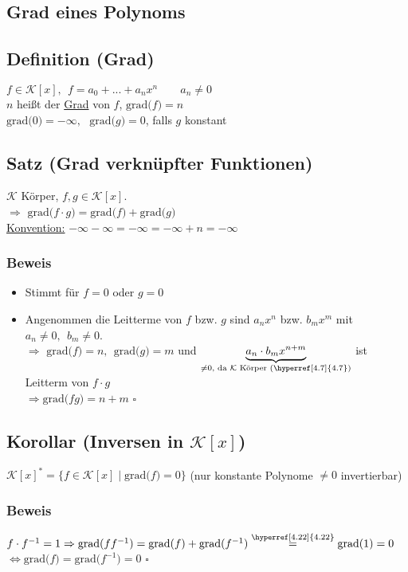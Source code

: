 \documentclass[a4paper, 12pt,titlepage, pdf, headsepline]{scrartcl}
\newcommand{\grad}[1]{\textrm{grad(}#1\textrm{)}}
\newcommand{\K}{\mathcal{K}}
\newcommand{\uline}[1]{\underline{#1}}
\newcommand{\qed}{\hfill$\square$}
\renewcommand{\>}{\rightarrow}
\renewcommand{\*}{\cdot}
\begin{document}
		      	\subsection*{Grad eines Polynoms}
		      	\subsection{Definition (Grad)}
		      	$f \in \K[x], ~~f = a_0 + ... + a_nx^n  \qquad a_n \neq 0$\\
		      	$n$ heißt der \uline{Grad} von $f$, $\grad{f}= n$\\
		      	$\grad{0}= -\infty,~~~\grad{g}= 0$, falls $g$ konstant
		      	\subsection{Satz (Grad verknüpfter Funktionen)}
		      	\label{4.22}
		      	$\K$ Körper, $f,g \in \K[x]$.\\
		      	$\Rightarrow$ $\grad{f\*g} = \grad{f}+\grad{g}$ \\
		      	\uline{Konvention:} \qquad$-\infty - \infty = -\infty = -\infty + n = - \infty$
		      	\subsubsection*{Beweis}
		      	\begin{itemize}
		      		\item Stimmt für $f = 0 $ oder $g = 0$
		      		\item Angenommen die Leitterme von $f$ bzw. $g$ sind $a_nx^n$ bzw. $b_mx^m$ mit\\ $a_n \neq 0,~~ b_m \neq 0$.\\
		      		      $\Rightarrow$ $\grad{f} = n,~~\grad{g} = m$ und $\underbrace{a_n \cdot b_m x^{n+m}}_{\neq0\textrm{, da }\K\textrm{ Körper (\hyperref[4.7]{4.7})}}$ ist Leitterm von $f \cdot g $\\$
		      		      \Rightarrow \grad{fg} = n+m$ \qed
		      	\end{itemize}
		      	\subsection{Korollar (Inversen in $\K[x]$)}
		      	$\K[x]^* = \{f \in \K[x]\mid\grad{f}= 0 \}$ (nur konstante Polynome $\neq 0$ invertierbar)
		      	\subsubsection*{Beweis}
		      	$f \cdot f^{-1} = 1 \Rightarrow\grad{ff^{-1}}=\grad{f}+\grad{f^{-1}}\overset{\textrm{\hyperref[4.22]{4.22}}}{=}\grad{1}=0$\\
		      	\noindent\hspace*{19mm}$\Leftrightarrow\grad{f}=\grad{f^{-1}}=0$ \qed
\end{document}
